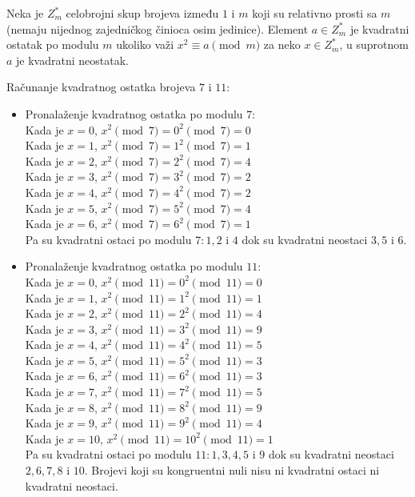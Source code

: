 \begin{definition}
	Neka je $Z_{m}^{*}$ celobrojni skup brojeva između $1$ i $m$ koji su relativno prosti sa $m$ (nemaju nijednog zajedničkog činioca osim jedinice). Element $a \in Z_{m}^{*}$ je kvadratni ostatak po modulu $m$ ukoliko važi $x^{2} \equiv a \pmod m$  za neko $x \in Z_{m}^{*}$, u suprotnom $a$ je kvadratni neostatak. 
\end{definition}

\begin{npra}
	\label{kvost7i11}
	Računanje kvadratnog ostatka brojeva $7$ i $11$:
	\begin{itemize}
		\item Pronalaženje kvadratnog ostatka po modulu $7$:\\
		Kada je $x=0$, $x^{2} \pmod 7 = 0^{2} \pmod 7 = 0$\\
		Kada je $x=1$, $x^{2} \pmod 7 = 1^{2} \pmod 7 = 1$\\
		Kada je $x=2$, $x^{2} \pmod 7 = 2^{2} \pmod 7 = 4$\\
		Kada je $x=3$, $x^{2} \pmod 7 = 3^{2} \pmod 7 = 2$\\
		Kada je $x=4$, $x^{2} \pmod 7 = 4^{2} \pmod 7 = 2$\\
		Kada je $x=5$, $x^{2} \pmod 7 = 5^{2} \pmod 7 = 4$\\
		Kada je $x=6$, $x^{2} \pmod 7 = 6^{2} \pmod 7 = 1$\\
		Pa su kvadratni ostaci po modulu $7: 1,2$ i $4$ dok su kvadratni neostaci $3,5$ i $6$. 
		\item Pronalaženje kvadratnog ostatka po modulu $11$:\\
		Kada je $x=0$, $x^{2} \pmod{11} = 0^{2} \pmod{11} = 0$\\
		Kada je $x=1$, $x^{2} \pmod{11} = 1^{2} \pmod{11} = 1$\\
		Kada je $x=2$, $x^{2} \pmod{11} = 2^{2} \pmod{11} = 4$\\
		Kada je $x=3$, $x^{2} \pmod{11} = 3^{2} \pmod{11} = 9$\\
		Kada je $x=4$, $x^{2} \pmod{11} = 4^{2} \pmod{11} = 5$\\
		Kada je $x=5$, $x^{2} \pmod{11} = 5^{2} \pmod{11} = 3$\\
		Kada je $x=6$, $x^{2} \pmod{11} = 6^{2} \pmod{11} = 3$\\
		Kada je $x=7$, $x^{2} \pmod{11} = 7^{2} \pmod{11} = 5$\\
		Kada je $x=8$, $x^{2} \pmod{11} = 8^{2} \pmod{11} = 9$\\
		Kada je $x=9$, $x^{2} \pmod{11} = 9^{2} \pmod{11} = 4$\\
		Kada je $x=10$, $x^{2} \pmod{11} = 10^{2} \pmod{11} = 1$\\
		Pa su kvadratni ostaci po modulu $11: 1,3,4,5$ i $9$ dok su kvadratni neostaci $2,6,7,8$ i $10$. Brojevi koji su kongruentni nuli nisu ni kvadratni ostaci ni kvadratni neostaci.
	\end{itemize}
\end{npra}

